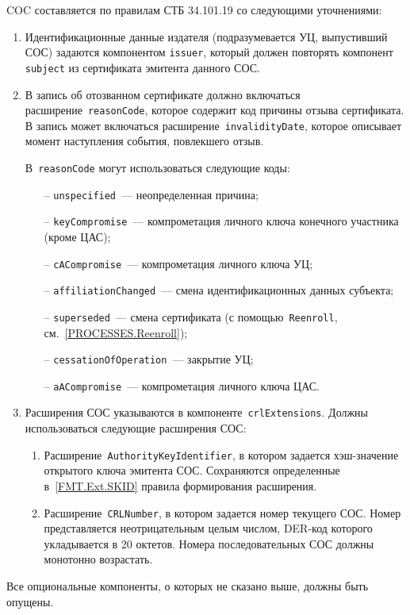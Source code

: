 COC составляется по правилам СТБ 34.101.19 со следующими уточнениями:
\begin{enumerate}

\item
Идентификационные данные издателя (подразумевается УЦ, 
выпустивший СОС) задаются компонентом \texttt{issuer}, 
который должен повторять компонент \texttt{subject} из 
сертификата эмитента данного СОС.  
%

\item

В запись об отозванном сертификате должно включаться
расширение~\texttt{reasonCode}, которое содержит код причины отзыва
сертификата.
%
В запись может включаться расширение~\texttt{invalidityDate}, которое 
описывает момент наступления события, повлекшего отзыв.

В~\texttt{reasonCode} могут использоваться следующие коды:
\begin{itemize}
\item[--]
\texttt{unspecified}~--- неопределенная причина;
\item[--]
\texttt{keyCompromise}~--- компрометация личного ключа конечного участника 
(кроме ЦАС); 
\item[--]
\texttt{cACompromise}~--- компрометация личного ключа УЦ;
\item[--]
\texttt{affiliationChanged}~--- смена идентификационных данных субъекта;
\item[--]
\texttt{superseded}~--- смена сертификата (с помощью~\texttt{Reenroll}, 
см.~\ref{PROCESSES.Reenroll}); 
\item[--]
\texttt{cessationOfOperation}~--- закрытие УЦ;
\item[--]
\texttt{aACompromise}~--- компрометация личного ключа ЦАС.
\end{itemize}

\item
Расширения СОС указываются в компоненте~\texttt{crlExtensions}.
Должны использоваться следующие расширения СОС:
\begin{enumerate}
\item 
Расширение~\texttt{AuthorityKeyIdentifier}, в котором задается 
хэш-значение открытого ключа эмитента СОС. 
%
Сохраняются определенные в~\ref{FMT.Ext.SKID} правила формирования 
расширения.

\item
Расширение~\texttt{CRLNumber}, в котором задается номер текущего СОС.
Номер представляется неотрицательным целым числом, 
DER-код которого укладывается в 20 октетов. 
Номера последовательных СОС должны монотонно возрастать.
\end{enumerate}

\end{enumerate}

Все опциональные компоненты, о которых не сказано выше, должны быть 
опущены.
